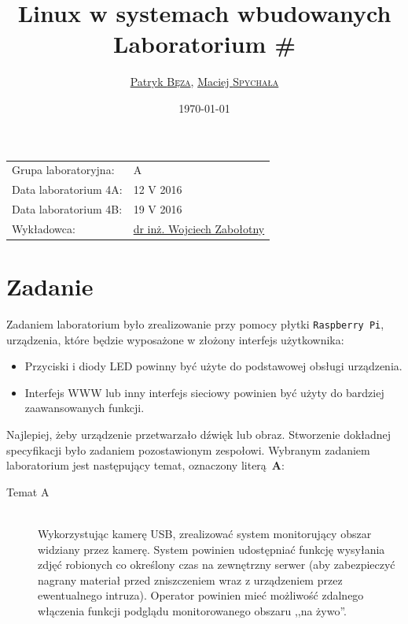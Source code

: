 \documentclass{article}
\title{Linux w systemach wbudowanych\\Laboratorium \#\labnumber}
\author{\href{mailto:bezap@student.mini.pw.edu.pl}{Patryk \textsc{Bęza}}, \href{mailto:spychalam@student.mini.pw.edu.pl}{Maciej \textsc{Spychała}}}
\date{\today}
\newcommand{\labnumber}{4}
\begin{document}
\maketitle

\begin{center}
\begin{tabular}{ll}
Grupa laboratoryjna: & A\\
Data laboratorium \labnumber A: & 12 V 2016\\
Data laboratorium \labnumber B: & 19 V 2016\\
Wykładowca: & \href{mailto:wzab@ise.pw.edu.pl}{dr inż. Wojciech Zabołotny}
\end{tabular}
\end{center}



\section{Zadanie}
\label{task}

Zadaniem laboratorium było zrealizowanie przy pomocy płytki \texttt{Raspberry~Pi}, urządzenia, które będzie wyposażone w złożony interfejs użytkownika:
\begin{itemize}
	\item Przyciski i diody LED powinny być użyte do podstawowej obsługi urządzenia.
	\item Interfejs WWW lub inny interfejs sieciowy powinien być użyty do bardziej zaawansowanych funkcji.
\end{itemize}
Najlepiej, żeby urządzenie przetwarzało dźwięk lub obraz. Stworzenie dokładnej specyfikacji było zadaniem pozostawionym zespołowi. Wybranym zadaniem laboratorium jest następujący temat, oznaczony literą~\textbf{A}:
\begin{description}
\item[Temat A]\hfill\\Wykorzystując kamerę USB, zrealizować system monitorujący obszar widziany przez kamerę. System powinien udostępniać funkcję wysyłania zdjęć robionych co określony czas na zewnętrzny serwer (aby zabezpieczyć nagrany materiał przed zniszczeniem wraz z urządzeniem przez ewentualnego intruza). Operator powinien mieć możliwość zdalnego włączenia funkcji podglądu monitorowanego obszaru ,,na żywo''.
\end{description}
\end{document}
